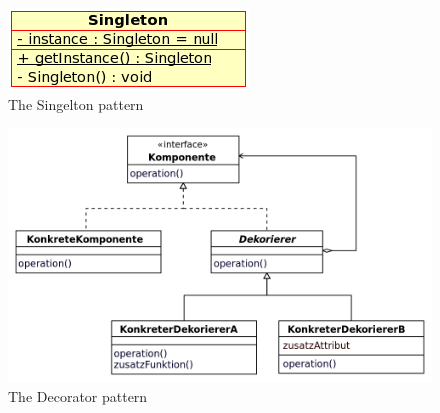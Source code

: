 \documentclass[../main/main.tex]{subfiles}
\begin{document}
\begin{figure}
  \includegraphics{../figures/singelton.png}  
  \caption{The Singelton pattern}
  \label{fig:singelton}
\end{figure}

\begin{figure}
  \includegraphics{../figures/decorator.png}  
  \caption{The Decorator pattern}
  \label{fig:decorator}
\end{figure}


\end{document}
